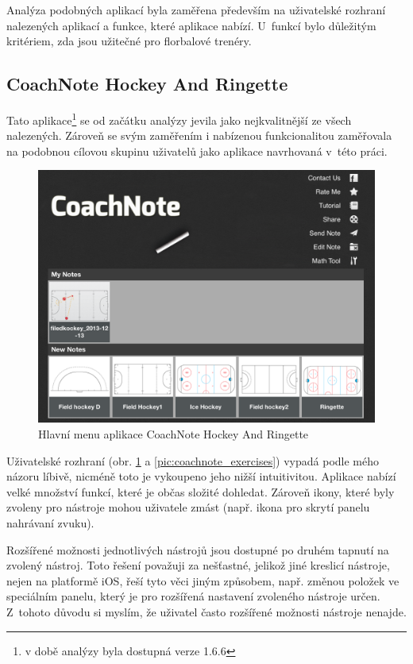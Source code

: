 \documentclass[thesis=B,czech]{FITthesis}[2012/06/26]
\begin{document}
	Analýza podobných aplikací byla zaměřena především na uživatelské rozhraní nalezených aplikací a funkce, které aplikace nabízí. U~funkcí bylo důležitým kritériem, zda jsou užitečné pro florbalové trenéry.

	\subsection{CoachNote Hockey And Ringette \cite{coachnoteAppstore}}

	Tato aplikace\footnote{v době analýzy byla dostupná verze 1.6.6} se od začátku analýzy jevila jako nejkvalitnější ze všech nalezených. Zároveň se svým zaměřením i nabízenou funkcionalitou zaměřovala na podobnou cílovou skupinu uživatelů jako aplikace navrhovaná v~této práci.

	\begin{figure}[h!t]
		\centering
		\includegraphics[width=\textwidth]{img/competition/coachnote/IMG_0015}
		\caption{Hlavní menu aplikace CoachNote Hockey And Ringette}
		\label{pic:coachnote_menu}
	\end{figure}

	Uživatelské rozhraní (obr. \ref{pic:coachnote_menu} a \ref{pic:coachnote_exercises}) vypadá podle mého názoru líbivě, nicméně toto je vykoupeno jeho nižší intuitivitou. Aplikace nabízí velké množství funkcí, které je občas složité dohledat. Zároveň ikony, které byly zvoleny pro nástroje mohou uživatele zmást (např. ikona pro skrytí panelu nahrávaní zvuku).

	Rozšířené možnosti jednotlivých nástrojů jsou dostupné po druhém tapnutí na zvolený nástroj. Toto řešení považuji za nešťastné, jelikož jiné kreslicí nástroje, nejen na platformě iOS, řeší tyto věci jiným způsobem, např. změnou položek ve speciálním panelu, který je pro rozšířená nastavení zvoleného nástroje určen. Z~tohoto důvodu si myslím, že uživatel často rozšířené možnosti nástroje nenajde.
\end{document}
